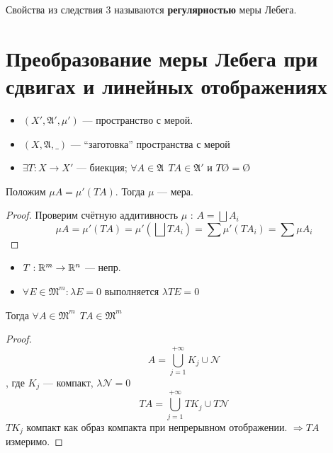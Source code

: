 \begin{definition}
    Свойства из следствия 3 называются \textbf{регулярностью} меры Лебега.
\end{definition}

\section*{Преобразование меры Лебега при сдвигах и линейных отображениях}

\begin{lemma}\itemfix
    \begin{itemize}
        \item \((X', \mathfrak{A}', \mu')\) --- пространство с мерой.
        \item \((X, \mathfrak{A}, \_)\) --- ``заготовка'' пространства с мерой
        \item \(\exists T : X \to X'\) --- биекция; \(\forall A\in \mathfrak{A}\ \ TA\in \mathfrak{A}'\) и \(T\text{\O} = \text{\O}\)
    \end{itemize}

    Положим \(\mu A = \mu'(TA)\). Тогда \(\mu\) --- мера.
\end{lemma}
\begin{proof}
    Проверим счётную аддитивность \(\mu\) : \(A = \bigsqcup A_i\)
    \[\mu A = \mu'(TA) = \mu'\left(\bigsqcup TA_i\right) = \sum \mu'(TA_i) = \sum \mu A_i\]
\end{proof}

\begin{lemma}\itemfix
    \begin{itemize}
        \item \(T : \mathbb{R}^m \to \mathbb{R}^n\) --- непр.
        \item \(\forall E\in \mathfrak{M}^m : \lambda E = 0\) выполняется \(\lambda TE = 0\)
    \end{itemize}
    Тогда \(\forall A\in \mathfrak{M}^m \ \ TA\in \mathfrak{M}^m\)
\end{lemma}
\begin{proof}
    \[A = \bigcup_{j = 1}^{+\infty} K_j\cup \mathcal{N}\]
    , где \(K_j\) --- компакт, \(\lambda \mathcal{N} = 0\)
    \[TA = \bigcup_{j = 1}^{+\infty} TK_j \cup T\mathcal{N}\]
    \(TK_j\) компакт как образ компакта при непрерывном отображении. \(\Rightarrow TA\) измеримо.
\end{proof}

